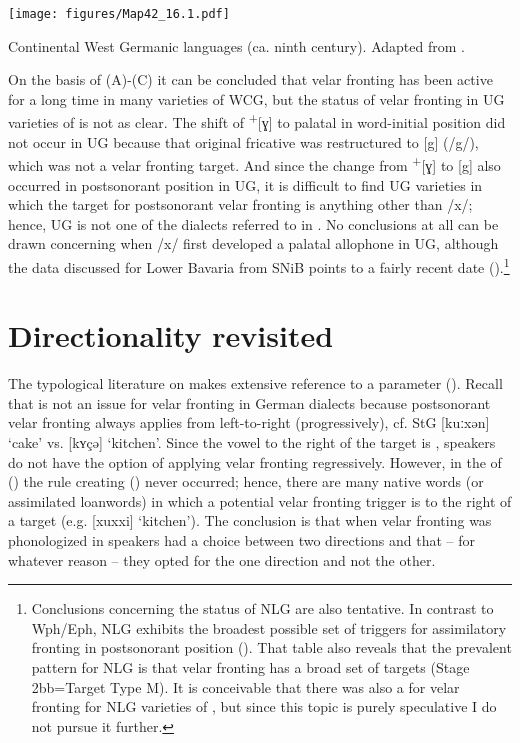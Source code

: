 \begin{map}
\texttt{[image: figures/Map42\_16.1.pdf]}
\caption[Continental  languages (ca. ninth century)]{Continental West Germanic languages (ca. ninth century). Adapted from \citet[209]{MeinekeSchwerdt2001}.}\label{map:42}
\end{map}

On the basis of (A)-(C) it can be concluded that velar fronting has been active for a long time in many varieties of WCG, but the status of velar fronting in UG varieties of  is not as clear. The shift of  \textsuperscript{+}[ɣ] to palatal in word-initial position did not occur in UG because that original fricative was restructured to [g] (/g/), which was not a velar fronting target. And since the change from  \textsuperscript{+}[ɣ] to [g] also occurred in postsonorant position in UG, it is difficult to find UG varieties in which the target for postsonorant velar fronting is anything other than /x/; hence, UG is not one of the dialects referred to in . No conclusions at all can be drawn concerning when /x/ first developed a palatal allophone in UG, although the data discussed for Lower Bavaria from SNiB points to a fairly recent date ().\footnote{\textrm{Conclusions concerning the status of NLG are also tentative. In contrast to Wph/Eph, NLG exhibits the broadest possible set of triggers for assimilatory fronting in postsonorant position (). That table also reveals that the prevalent pattern for NLG is that velar fronting has a broad set of targets (Stage 2bb=Target Type M). It is conceivable that there was also a  for velar fronting for NLG varieties of , but since this topic is purely speculative I do not pursue it further.}}

\section{{Directionality} {revisited}}\label{sec:16.5}

The typological literature on  makes extensive reference to a  parameter (). Recall that  is not an issue for velar fronting in German dialects because postsonorant velar fronting always applies from left-to-right (progressively), cf. StG [kuːxən] ‘cake’ vs. [kʏçə] ‘kitchen’. Since the vowel to the right of the target is , speakers do not have the option of applying velar fronting regressively. However, in the  of  () the rule creating  () never occurred; hence, there are many native words (or assimilated loanwords) in which a potential velar fronting trigger is to the right of a target (e.g. [xuxxi] ‘kitchen’). The conclusion is that when velar fronting was phonologized in  speakers had a choice between two directions and that -- for whatever reason -- they opted for the one direction and not the other.


